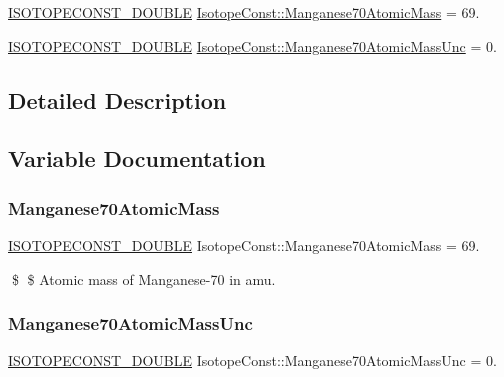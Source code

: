 \begin{DoxyCompactItemize}
\item 
\mbox{\hyperlink{group___isotope_const-_macros_ga8f45a7272ce02c0b4c65c44636ed719a}{I\+S\+O\+T\+O\+P\+E\+C\+O\+N\+S\+T\+\_\+\+D\+O\+U\+B\+LE}} \mbox{\hyperlink{group___isotope_const-_manganese-_mn70_gab0401c43fbcfe584a29915f6f8ef4bf7}{Isotope\+Const\+::\+Manganese70\+Atomic\+Mass}} = 69.
\item 
\mbox{\hyperlink{group___isotope_const-_macros_ga8f45a7272ce02c0b4c65c44636ed719a}{I\+S\+O\+T\+O\+P\+E\+C\+O\+N\+S\+T\+\_\+\+D\+O\+U\+B\+LE}} \mbox{\hyperlink{group___isotope_const-_manganese-_mn70_ga5282a04440f2dcf2de93fefa2fba7bb1}{Isotope\+Const\+::\+Manganese70\+Atomic\+Mass\+Unc}} = 0.
\end{DoxyCompactItemize}


\subsection{Detailed Description}


\subsection{Variable Documentation}
\mbox{\label{group___isotope_const-_manganese-_mn70_gab0401c43fbcfe584a29915f6f8ef4bf7}} 
\subsubsection{\texorpdfstring{Manganese70\+Atomic\+Mass}{Manganese70AtomicMass}}
{\footnotesize\ttfamily \mbox{\hyperlink{group___isotope_const-_macros_ga8f45a7272ce02c0b4c65c44636ed719a}{I\+S\+O\+T\+O\+P\+E\+C\+O\+N\+S\+T\+\_\+\+D\+O\+U\+B\+LE}} Isotope\+Const\+::\+Manganese70\+Atomic\+Mass = 69.}

\$ \$ Atomic mass of Manganese-\/70 in amu. \mbox{\label{group___isotope_const-_manganese-_mn70_ga5282a04440f2dcf2de93fefa2fba7bb1}} 
\subsubsection{\texorpdfstring{Manganese70\+Atomic\+Mass\+Unc}{Manganese70AtomicMassUnc}}
{\footnotesize\ttfamily \mbox{\hyperlink{group___isotope_const-_macros_ga8f45a7272ce02c0b4c65c44636ed719a}{I\+S\+O\+T\+O\+P\+E\+C\+O\+N\+S\+T\+\_\+\+D\+O\+U\+B\+LE}} Isotope\+Const\+::\+Manganese70\+Atomic\+Mass\+Unc = 0.}

